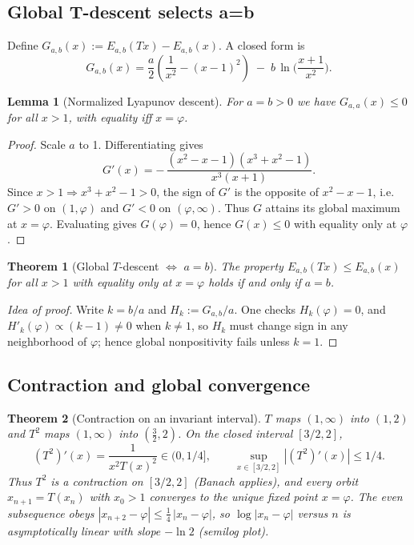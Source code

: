 \documentclass[11pt]{article}
\newtheorem{theorem}{Theorem}
\newtheorem{lemma}{Lemma}
\theoremstyle{remark}
\theoremstyle{definition}
\newcommand{\ph}{\varphi}
\begin{document}
\subsection{Global T-descent selects a=b}
Define $G_{a,b}(x):=E_{a,b}(Tx)-E_{a,b}(x)$. A closed form is
\begin{equation}
G_{a,b}(x)=\frac{a}{2}\left(\frac{1}{x^2}-(x-1)^2\right)\;-\;b\,\ln\!\Big(\frac{x+1}{x^2}\Big).
\end{equation}
\begin{lemma}[Normalized Lyapunov descent]
For $a=b>0$ we have $G_{a,a}(x)\le0$ for all $x>1$, with equality iff $x=\ph$.
\end{lemma}
\begin{proof}
Scale $a$ to 1. Differentiating gives
\begin{equation}
G'(x)=-\,\frac{(x^2-x-1)(x^3+x^2-1)}{x^3(x+1)}.
\end{equation}
Since $x>1\Rightarrow x^3+x^2-1>0$, the sign of $G'$ is the opposite of $x^2-x-1$, i.e.\ $G'>0$ on $(1,\varphi)$ and $G'<0$ on $(\varphi,\infty)$. Thus $G$ attains its global maximum at $x=\varphi$. Evaluating gives $G(\varphi)=0$, hence $G(x)\le0$ with equality only at $\varphi$.
\end{proof}
\begin{theorem}[Global $T$-descent $\Leftrightarrow$ $a=b$]\label{thm:a=b}
The property $E_{a,b}(Tx)\le E_{a,b}(x)$ for all $x>1$ with equality only at $x=\varphi$ holds if and only if $a=b$.
\end{theorem}
\begin{proof}[Idea of proof]
Write $k=b/a$ and $H_k:=G_{a,b}/a$. One checks $H_k(\varphi)=0$, and $H'_k(\varphi)\propto (k-1)\neq0$ when $k\neq1$, so $H_k$ must change sign in any neighborhood of $\varphi$; hence global nonpositivity fails unless $k=1$.
\end{proof}

\subsection{Contraction and global convergence}
\begin{theorem}[Contraction on an invariant interval]\label{thm:contraction}
$T$ maps $(1,\infty)$ into $(1,2)$ and $T^2$ maps $(1,\infty)$ into $(\tfrac32,2)$. On the closed interval $[3/2,2]$,
\begin{equation}
 (T^2)'(x)=\frac{1}{x^2T(x)^2}\in(0,1/4],\qquad \sup_{x\in[3/2,2]}|(T^2)'(x)|\le 1/4.
\end{equation}
Thus $T^2$ is a contraction on $[3/2,2]$ (Banach applies), and every orbit $x_{n+1}=T(x_n)$ with $x_0>1$ converges to the unique fixed point $x=\varphi$. The even subsequence obeys $|x_{n+2}-\varphi|\le \tfrac14\,|x_n-\varphi|$, so $\log|x_n-\varphi|$ versus $n$ is asymptotically linear with slope $-\ln 2$ (semilog plot).
\end{theorem}
\end{document}
